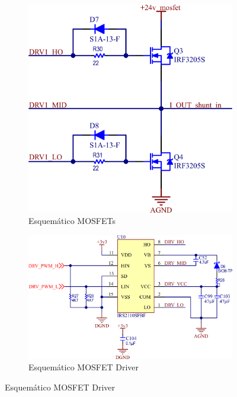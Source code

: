 \documentclass[../et.tex]{subfiles}
\begin{document}
\begin{figure}[!htbp]
  \centering
  \begin{subfigure}[b]{0.4\textwidth}
    \centering
    \includegraphics[width=\textwidth]{../images/mosfet.png}
    \caption{Esquemático MOSFETs}
    \label{fig:mosfet}
    \vspace*{10mm}
  \end{subfigure}
  \hfill
  \begin{subfigure}[b]{0.55\textwidth}
    \centering
    \includegraphics[width=\textwidth]{../images/mosfet-driver.png}
    \caption{Esquemático MOSFET Driver}
    \label{fig:mosfet-driver}
    \vspace*{10mm}
  \end{subfigure}


\end{figure}
\end{document}
